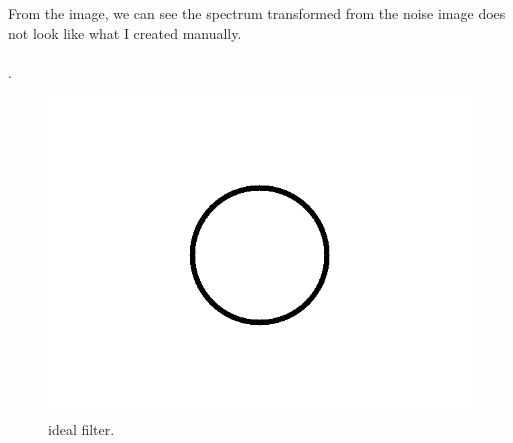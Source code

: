 \documentclass[14pt]{article}
\begin{document}
		From the image, we can see the spectrum transformed from the noise image does not look like what I created manually.\\\\
		.~
			\begin{figure}[hbt!]
				\centering
				
					\includegraphics[width=0.9\linewidth]{ideal.png}
					\caption{ideal filter.}
			\end{figure}
			
\end{document}
